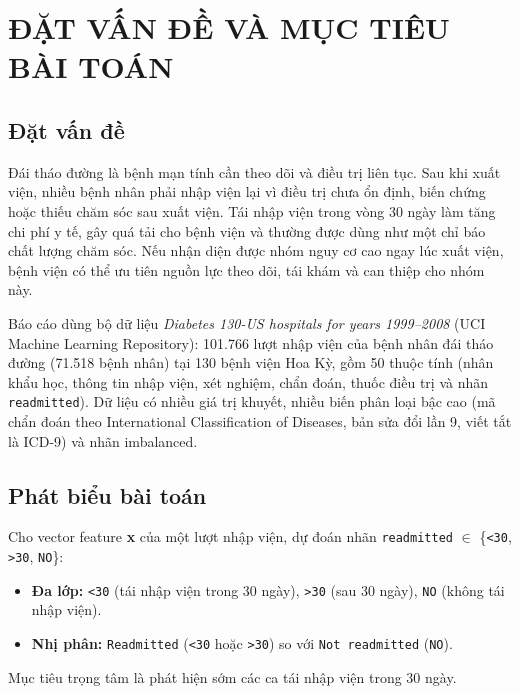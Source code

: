 \documentclass[a4paper]{report}
\begin{document}
\phanchinh

\section{ĐẶT VẤN ĐỀ VÀ MỤC TIÊU BÀI TOÁN}

\subsection{Đặt vấn đề}

Đái tháo đường là bệnh mạn tính cần theo dõi và điều trị liên tục. Sau khi xuất viện, nhiều bệnh nhân phải nhập viện lại vì điều trị chưa ổn định, biến chứng hoặc thiếu chăm sóc sau xuất viện. Tái nhập viện trong vòng 30 ngày làm tăng chi phí y tế, gây quá tải cho bệnh viện và thường được dùng như một chỉ báo chất lượng chăm sóc. Nếu nhận diện được nhóm nguy cơ cao ngay lúc xuất viện, bệnh viện có thể ưu tiên nguồn lực theo dõi, tái khám và can thiệp cho nhóm này.

Báo cáo dùng bộ dữ liệu \textit{Diabetes 130-US hospitals for years 1999–2008} (UCI Machine Learning Repository): 101.766 lượt nhập viện của bệnh nhân đái tháo đường (71.518 bệnh nhân) tại 130 bệnh viện Hoa Kỳ, gồm 50 thuộc tính (nhân khẩu học, thông tin nhập viện, xét nghiệm, chẩn đoán, thuốc điều trị và nhãn \texttt{readmitted}). Dữ liệu có nhiều giá trị khuyết, nhiều biến phân loại bậc cao (mã chẩn đoán theo International Classification of Diseases, bản sửa đổi lần 9, viết tắt là ICD-9) và nhãn imbalanced.

\subsection{Phát biểu bài toán}

Cho vector feature \textbf{x} của một lượt nhập viện, dự đoán nhãn \texttt{readmitted} $\in$ \{\texttt{<30}, \texttt{>30}, \texttt{NO}\}:

\begin{itemize}
  \item \textbf{Đa lớp:} \texttt{<30} (tái nhập viện trong 30 ngày), \texttt{>30} (sau 30 ngày), \texttt{NO} (không tái nhập viện).
  \item \textbf{Nhị phân:} \texttt{Readmitted} (\texttt{<30} hoặc \texttt{>30}) so với \texttt{Not readmitted} (\texttt{NO}).
\end{itemize}

Mục tiêu trọng tâm là phát hiện sớm các ca tái nhập viện trong 30 ngày.
\end{document}
